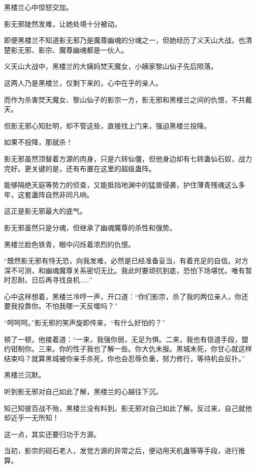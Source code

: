 
\begin{this_body}

黑楼兰心中惊怒交加。

影无邪陡然发难，让她处境十分被动。

即便黑楼兰不知道影无邪乃是魔尊幽魂的分魂之一，但她经历了义天山大战，也清楚影无邪、影宗、魔尊幽魂都是一伙人。

义天山大战中，黑楼兰的大姨妈焚天魔女，小姨家黎山仙子先后陨落。

这两人乃是黑楼兰，仅剩下来的，心中在乎的亲人。

而作为杀害焚天魔女、黎山仙子的影宗一方，影无邪和黑楼兰之间的仇恨，不共戴天。

但影无邪心知肚明，却不管这些，直接找上门来，强迫黑楼兰投降。

如果不投降，那就杀！

影无邪虽然顶替着方源的肉身，只是六转仙僵，但他身边却有七转蛊仙石奴，战力完好。更关键的是，还有布置在这里的超级蛊阵。

能够隔绝天庭等势力的侦查，又能抵挡地渊中的猛兽侵袭，护住薄青残魂这么多年，这套蛊阵自然非同凡响。

这正是影无邪最大的底气。

影无邪虽然只是分魂，但继承了幽魂魔尊的杀性和强势。

黑楼兰脸色铁青，眼中闪烁着浓烈的仇恨。

“既然影无邪有恃无恐，向我发难，必然是已经准备妥当，有着充足的自信。对方深不可测，和幽魂魔尊关系密切无比。我此时要顽抗到底，恐怕下场堪忧。唯有暂时忍耐。日后再寻找良机……”

心中这样想着，黑楼兰冷哼一声，开口道：“你们影宗，杀了我的两位亲人，你还要我投靠你。不怕我哪一天反噬吗？”

“呵呵呵。”影无邪的笑声旋即传来，“有什么好怕的？”

顿了一顿，他接着道：“一来，我强你弱，无足为惧。二来，我也有信道手段，盟约钳制你。三来。你的性子我也了解一些。你大仇未报。黑城未死，你甘心就这样结束吗？就算黑城被你亲手杀死，你也会忍辱负重，努力修行，等待机会反扑。”

黑楼兰沉默。

听到影无邪对自己如此了解，黑楼兰的心越往下沉。

知己知彼百战不殆，黑楼兰没有料到。影无邪对自己如此了解。反过来，自己就他却近乎一无所知！

这一点，其实还要归功于方源。

当初，影宗的砚石老人，发觉方源的异常之后，便动用天机蛊等等手段，进行推算。


\end{this_body}
